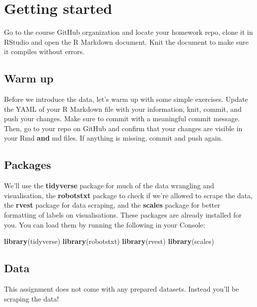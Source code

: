 \documentclass[
]{article}
\newenvironment{Shaded}{\begin{snugshade}}{\end{snugshade}}
\newcommand{\FunctionTok}[1]{\textcolor[rgb]{0.13,0.29,0.53}{\textbf{#1}}}
\newcommand{\NormalTok}[1]{#1}
\begin{document}
\section{Getting started}\label{getting-started}

Go to the course GitHub organization and locate your homework repo,
clone it in RStudio and open the R Markdown document. Knit the document
to make sure it compiles without errors.

\subsection{Warm up}\label{warm-up}

Before we introduce the data, let's warm up with some simple exercises.
Update the YAML of your R Markdown file with your information, knit,
commit, and push your changes. Make sure to commit with a meaningful
commit message. Then, go to your repo on GitHub and confirm that your
changes are visible in your Rmd \textbf{and} md files. If anything is
missing, commit and push again.

\subsection{Packages}\label{packages}

We'll use the \textbf{tidyverse} package for much of the data wrangling
and visualisation, the \textbf{robotstxt} package to check if we're
allowed to scrape the data, the \textbf{rvest} package for data
scraping, and the \textbf{scales} package for better formatting of
labels on visualisations. These packages are already installed for you.
You can load them by running the following in your Console:

\begin{Shaded}
\begin{Highlighting}[]
\FunctionTok{library}\NormalTok{(tidyverse)}
\FunctionTok{library}\NormalTok{(robotstxt)}
\FunctionTok{library}\NormalTok{(rvest)}
\FunctionTok{library}\NormalTok{(scales)}
\end{Highlighting}
\end{Shaded}

\subsection{Data}\label{data}

This assignment does not come with any prepared datasets. Instead you'll
be scraping the data!
\end{document}
